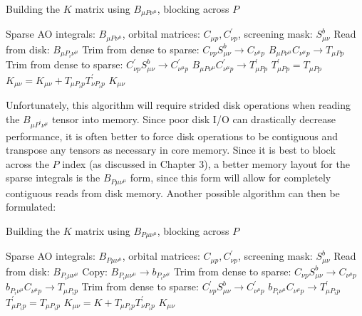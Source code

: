 \begin{algorithm}[H]
\caption{Building the $K$ matrix using $B_{\mu P \nu^\mu}$, blocking across $P$}
\begin{algorithmic}
\REQUIRE Sparse AO integrals: $B_{\mu P \nu^\mu}$, orbital matrices: $C_{\mu p}, C^{\prime}_{\nu p}$, screening mask: $S_{\mu \nu}^b$
    \STATE Read from disk: $B_{\mu P_i \nu^{\mu}}$
        \STATE Trim from dense to sparse: $C_{\nu p}S_{\mu \nu}^b \rightarrow C_{\nu^{\mu} p}$
        \STATE $B_{\mu P \nu^{\mu}} C_{\nu^{\mu} p} \rightarrow T_{\mu Pp}$
            \STATE Trim from dense to sparse: $C^{\prime}_{\nu p}S_{\mu \nu}^b \rightarrow C^{\prime}_{\nu^{\mu} p}$
            \STATE $B_{\mu P \nu^{\mu}} C^{\prime}_{\nu^{\mu} p} \rightarrow T^{\prime}_{\mu Pp}$
        \ELSE
            \STATE $T_{\mu P p}^{\prime} = T_{\mu P p}$ 
        \ENDIF
    \ENDFOR
    \STATE $K_{\mu \nu} = K_{\mu \nu} + T_{\mu P_i p} T^{\prime}_{\nu P_i p}$
\ENDFOR
\RETURN $K_{\mu \nu}$
\end{algorithmic}
\end{algorithm}

\noindent Unfortunately, this algorithm will require strided disk operations when reading the $B_{\mu P^i \nu^{\mu}}$ tensor into memory.
Since poor disk I/O can drastically decrease performance, it is often better to force disk operations 
to be contiguous and transpose any tensors as necessary in core memory. Since it is best to block across the $P$ index (as discussed in
Chapter 3), a better
memory layout for the sparse integrals is the $B_{P \mu \nu^\mu}$ form, since this form will allow for completely 
contiguous reads from disk memory. Another possible algorithm can then be formulated:

\begin{algorithm}[H]
\caption{Building the $K$ matrix using $B_{P \mu \nu^\mu}$, blocking across $P$}
\begin{algorithmic}
\REQUIRE Sparse AO integrals: $B_{P \mu \nu^\mu}$, orbital matrices: $C_{\mu p}, C^{\prime}_{\nu p}$, screening mask: $S_{\mu \nu}^b$
    \STATE Read from disk: $B_{P_i \mu \nu^{\mu}}$
        \STATE Copy: $B_{P_i \mu \nu^{\mu}} \rightarrow b_{P_i \nu^{\mu}}$
        \STATE Trim from dense to sparse: $C_{\nu p}S_{\mu \nu}^b \rightarrow C_{\nu^{\mu} p}$
        \STATE $b_{P_i \nu^{\mu}} C_{\nu^{\mu} p} \rightarrow T_{\mu P_i p}$
            \STATE Trim from dense to sparse: $C^{\prime}_{\nu p}S_{\mu \nu}^b \rightarrow C^{\prime}_{\nu^{\mu} p}$
            \STATE $b_{P_i \nu^{\mu}} C_{\nu^{\mu} p} \rightarrow T^{\prime}_{\mu P_i p}$
        \ELSE
            \STATE $T^{\prime}_{\mu P_i p} = T_{\mu P_i p}$ 
        \ENDIF
    \ENDFOR
    \STATE $K_{\mu \nu} = K +  T_{\mu P_i p} T^{\prime}_{\nu P_i p} $
\ENDFOR
\RETURN $K_{\mu \nu}$
\end{algorithmic}
\end{algorithm}

